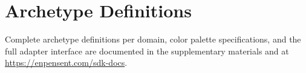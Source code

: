 \documentclass[11pt,a4paper]{article}
\begin{document}
\appendix
\section{Archetype Definitions}

Complete archetype definitions per domain, color palette specifications, and the
full adapter interface are documented in the supplementary materials and at
\url{https://enpensent.com/sdk-docs}.
\end{document}
